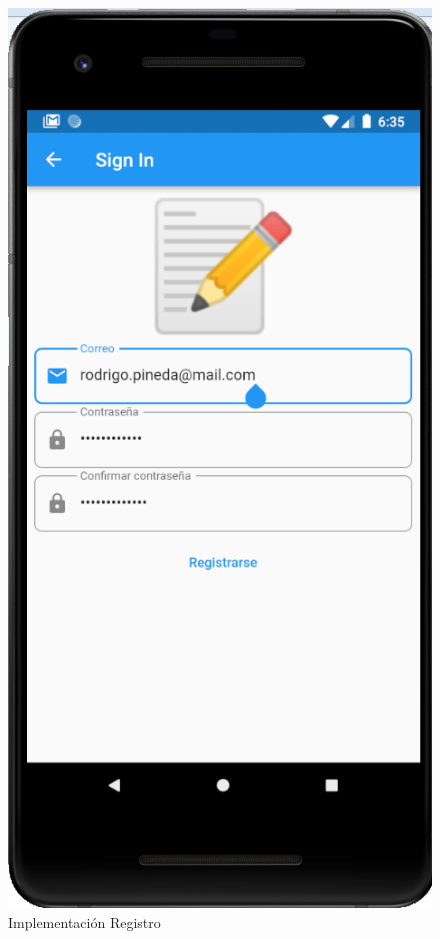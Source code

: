 \documentclass{article}
\begin{document}
\begin{figure}[H]
    \centering
    \includegraphics[scale=0.7]{imgs/Imp/Registro}
    \caption{Implementación Registro}
    \label{fig:implementacion_01}
\end{figure}
\end{document}

